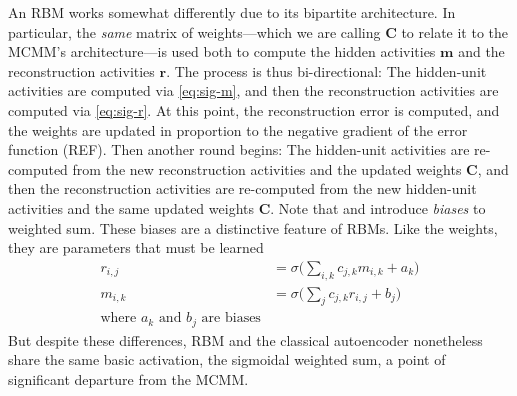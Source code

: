 An RBM works somewhat differently due to its bipartite architecture. In particular, the \emph{same} matrix of weights---which we are calling $\textbf{C}$ to relate it to the MCMM's architecture---is used both to compute the hidden activities $\textbf{m}$ and the
reconstruction activities $\textbf{r}$. The process is thus bi-directional: The hidden-unit activities are computed via \eqref{eq:sig-m}, and then the reconstruction activities are computed via \eqref{eq:sig-r}. At this point, the reconstruction error is computed, and the weights are updated in proportion to the negative gradient of the error function (REF). Then another round begins: The hidden-unit activities are re-computed from the new reconstruction activities and the updated weights $\textbf{C}$, and then  the reconstruction activities are re-computed from the new hidden-unit activities and the same updated weights $\textbf{C}$. Note that \label{eq:sig-r} and  \label{eq:sig-m} introduce \emph{biases} to weighted sum. These biases are a distinctive feature of RBMs. Like the weights, they are parameters that must be learned
\begin{align}
\label{eq:sig-r}
r_{i,j} &= \sigma\big(\sum_{i,k} c_{j,k} m_{i,k} + a_{k}\big) \\
\label{eq:sig-m}
m_{i,k} &= \sigma\big(\sum_{j} c_{j,k} r_{i,j} + b_{j}\big) \\
\text{where $a_{k}$ and $b_{j}$ are biases}
\end{align}
But despite these differences, RBM and the classical autoencoder nonetheless share the same basic activation, the sigmoidal weighted sum, a point of significant departure from the MCMM.


